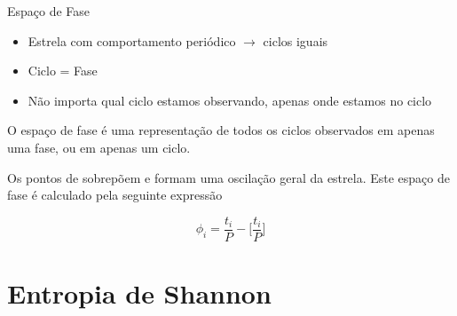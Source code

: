 \documentclass{beamer}
\begin{document}

\begin{frame}{Espaço de Fase}

\begin{itemize}
\item Estrela com comportamento periódico $\to$ ciclos iguais
\item Ciclo = Fase
\item Não importa qual ciclo estamos observando, apenas onde estamos no ciclo
\end{itemize}

O espaço de fase é uma representação de todos os ciclos observados em apenas uma fase, ou em apenas
um ciclo.
\vspace{5mm}

Os pontos de sobrepõem e formam uma oscilação geral da estrela. Este
espaço de fase é calculado pela seguinte expressão

\begin{equation}
\phi_i = \frac{t_i}{P} - \Big[\frac{t_i}{P}\Big]
\end{equation}


\end{frame}





\section{Entropia de Shannon}
\end{document}
